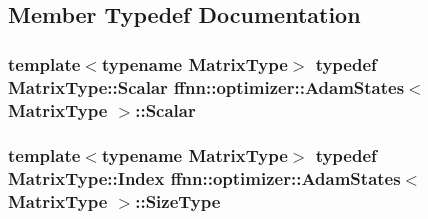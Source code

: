 \subsection{Member Typedef Documentation}
\hypertarget{classffnn_1_1optimizer_1_1_adam_states_a5ff656035aff83f1e06140d556e21977}{
\subsubsection[{Scalar}]{\setlength{\rightskip}{0pt plus 5cm}template$<$typename Matrix\-Type$>$ typedef Matrix\-Type\-::\-Scalar {\bf ffnn\-::optimizer\-::\-Adam\-States}$<$ Matrix\-Type $>$\-::{\bf Scalar}}}\label{classffnn_1_1optimizer_1_1_adam_states_a5ff656035aff83f1e06140d556e21977}
\hypertarget{classffnn_1_1optimizer_1_1_adam_states_a02c5c9a4b2a5689061570f493e842f0b}{
\subsubsection[{Size\-Type}]{\setlength{\rightskip}{0pt plus 5cm}template$<$typename Matrix\-Type$>$ typedef Matrix\-Type\-::\-Index {\bf ffnn\-::optimizer\-::\-Adam\-States}$<$ Matrix\-Type $>$\-::{\bf Size\-Type}}}\label{classffnn_1_1optimizer_1_1_adam_states_a02c5c9a4b2a5689061570f493e842f0b}


